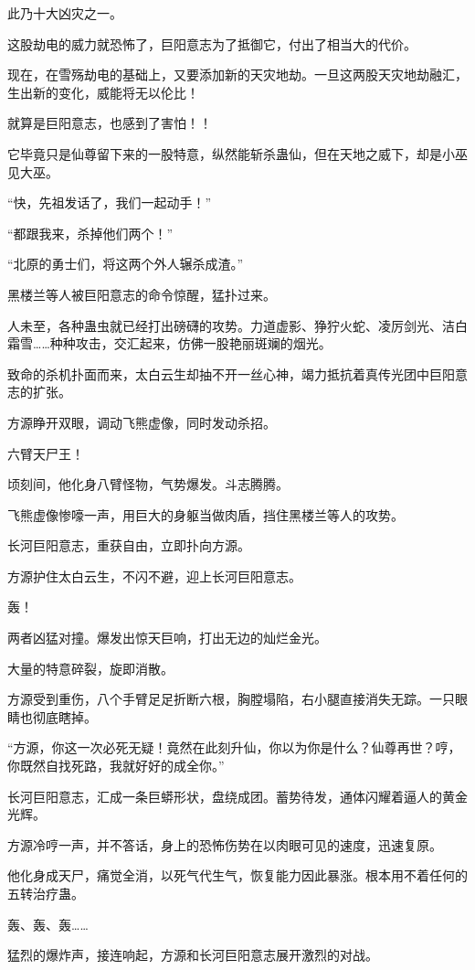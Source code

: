 \begin{this_body}
此乃十大凶灾之一。

这股劫电的威力就恐怖了，巨阳意志为了抵御它，付出了相当大的代价。

现在，在雪殇劫电的基础上，又要添加新的天灾地劫。一旦这两股天灾地劫融汇，生出新的变化，威能将无以伦比！

就算是巨阳意志，也感到了害怕！！

它毕竟只是仙尊留下来的一股特意，纵然能斩杀蛊仙，但在天地之威下，却是小巫见大巫。

“快，先祖发话了，我们一起动手！”

“都跟我来，杀掉他们两个！”

“北原的勇士们，将这两个外人辗杀成渣。”

黑楼兰等人被巨阳意志的命令惊醒，猛扑过来。

人未至，各种蛊虫就已经打出磅礴的攻势。力道虚影、狰狞火蛇、凌厉剑光、洁白霜雪……种种攻击，交汇起来，仿佛一股艳丽斑斓的烟光。

致命的杀机扑面而来，太白云生却抽不开一丝心神，竭力抵抗着真传光团中巨阳意志的扩张。

方源睁开双眼，调动飞熊虚像，同时发动杀招。

六臂天尸王！

顷刻间，他化身八臂怪物，气势爆发。斗志腾腾。

飞熊虚像惨嚎一声，用巨大的身躯当做肉盾，挡住黑楼兰等人的攻势。

长河巨阳意志，重获自由，立即扑向方源。

方源护住太白云生，不闪不避，迎上长河巨阳意志。

轰！

两者凶猛对撞。爆发出惊天巨响，打出无边的灿烂金光。

大量的特意碎裂，旋即消散。

方源受到重伤，八个手臂足足折断六根，胸膛塌陷，右小腿直接消失无踪。一只眼睛也彻底瞎掉。

“方源，你这一次必死无疑！竟然在此刻升仙，你以为你是什么？仙尊再世？哼，你既然自找死路，我就好好的成全你。”

长河巨阳意志，汇成一条巨蟒形状，盘绕成团。蓄势待发，通体闪耀着逼人的黄金光辉。

方源冷哼一声，并不答话，身上的恐怖伤势在以肉眼可见的速度，迅速复原。

他化身成天尸，痛觉全消，以死气代生气，恢复能力因此暴涨。根本用不着任何的五转治疗蛊。

轰、轰、轰……

猛烈的爆炸声，接连响起，方源和长河巨阳意志展开激烈的对战。


\end{this_body}
